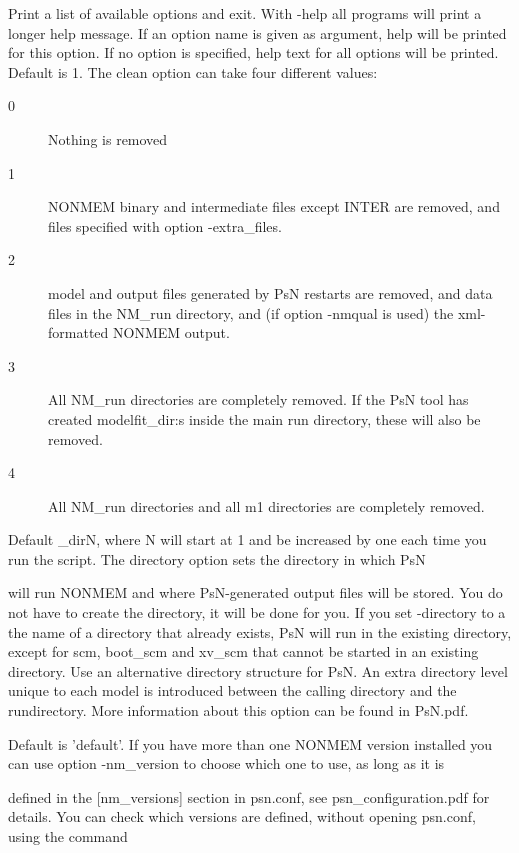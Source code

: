 \begin{optionlist}
Print a list of available options and exit. 
\nextopt
{}
With -help all programs will print a longer help message. If an option name is given as argument, help will be printed for this option. If no option is specified, help text for all options will be printed. 
\nextopt
{}
Default is 1. The clean option can take four different values:  
\begin{description}
	\item[0] Nothing is removed 
	\item[1] NONMEM binary and intermediate files except INTER are removed, and files specified with option -extra\_files. 
	\item[2] model and output files generated by PsN restarts are removed, and data files in the NM\_run directory, and (if option -nmqual is used) the xml-formatted NONMEM output. 
	\item[3] All NM\_run directories are completely removed. If the PsN tool has created modelfit\_dir:s inside the main run directory, these  will also be removed. 
	\item[4] All NM\_run directories and all m1 directories are completely removed.
\end{description}
\nextopt
{}

Default \guidetoolname\_dirN,
where N will start at 1 and be increased by one each time you run the script. The directory option sets the directory in which PsN 

will run NONMEM and where PsN-generated output files will be stored. You do not have to create the directory,  it will be done for you. If you set -directory to a the name of a directory that already exists, PsN will run in the existing directory, except for scm, boot\_scm and xv\_scm that cannot be started in an existing directory.
\nextopt
{}
	Use an alternative directory structure for PsN. An extra directory
    level unique to each model is introduced between the calling
    directory and the rundirectory. More information about this option can
    be found in PsN.pdf.
\nextopt
   
Default is 'default'. 
If you have more than one NONMEM version installed you can use option -nm\_version to choose which one to use, as long as it is 

defined in the [nm\_versions] section in psn.conf, see psn\_configuration.pdf for details. You can check which versions are defined, without opening psn.conf, using the command


\end{optionlist}
